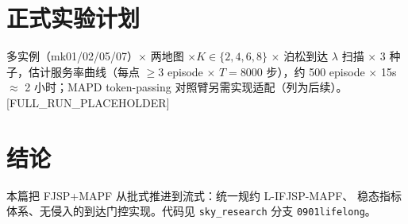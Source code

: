 \documentclass[UTF8,12pt,a4paper]{ctexart}
\begin{document}
\section{正式实验计划}

多实例（mk01/02/05/07）$\times$ 两地图 $\times K\in\{2,4,6,8\}$ $\times$
泊松到达 $\lambda$ 扫描 $\times$ 3 种子，估计服务率曲线（每点
$\ge$3 episode $\times$ $T{=}8000$ 步），约 500 episode $\times$ 15s
$\approx$ 2 小时；MAPD token-passing 对照臂另需实现适配（列为后续）。
[FULL\_RUN\_PLACEHOLDER]

\section{结论}

本篇把 FJSP+MAPF 从批式推进到流式：统一规约 L-IFJSP-MAPF、
稳态指标体系、无侵入的到达门控实现。代码见 \texttt{sky\_research}
分支 \texttt{0901lifelong}。



\end{document}

